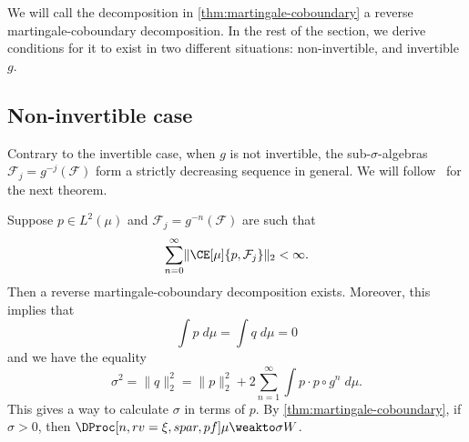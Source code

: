 \documentclass[../main]{subfiles}
\begin{document}
We will call the decomposition in \cref{thm:martingale-coboundary} a reverse martingale-coboundary decomposition. In the rest of the section, we derive conditions for it to exist in two different situations: non-invertible, and invertible \(g\).

\subsection{Non-invertible case}
Contrary to the invertible case, when \(g\) is not invertible, the sub-\(\sigma\)-algebras \(\mathcal{F}_j = g^{-j}(\mathcal{F})\) form a strictly decreasing sequence in general. We will follow~\cite[Proposition 2.12]{vianaStochasticDynamicsDeterministic1997} for the next theorem.

\begin{theorem}\label{thm:decomposition-existence}
  Suppose \(p \in L^2(\mu)\) and \(\mathcal{F}_j = g^{-n}(\mathcal{F})\) are such that
  \begin{equation*}
    \sum_{n = 0}^{\infty} \lVert \CE[\mu]{p, \mathcal{F}_j} \rVert_2 < \infty.
  \end{equation*}
  Then a reverse martingale-coboundary decomposition exists. Moreover, this implies that
  \begin{equation*}
    \int p \;d\mu = \int q \;d\mu = 0
  \end{equation*}
  and we have the equality
  \begin{equation*}
    \sigma ^2 = \lVert q \rVert^2_2 = \lVert p \rVert_2^2 + 2\sum_{n = 1}^{\infty} \int p \cdot p \circ g^n \;d\mu.
  \end{equation*}
  This gives a way to calculate \(\sigma\) in terms of \(p\). By \cref{thm:martingale-coboundary}, if \(\sigma > 0\), then \(\DProc[n,rv = \xi,spar,pf]\mu \weakto \sigma W\).
\end{theorem}
\end{document}
